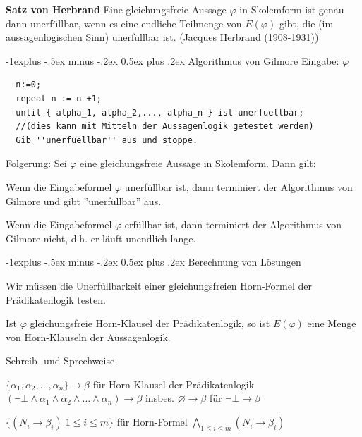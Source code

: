 \documentclass[a4paper]{article}
\makeatletter
\renewcommand{\note}[2]{\begin{noteBox} \textbf{#1} #2 \end{noteBox}}
\renewcommand{\subsection}{\@startsection{subsection}{2}{0mm}%
                {-1explus -.5ex minus -.2ex}%
                {0.5ex plus .2ex}%
                {\normalfont\normalsize\bfseries}}
\makeatother
\begin{document}
\begin{multicols}{3}
  \note{Satz von Herbrand}{Eine gleichungsfreie Aussage $\varphi$ in Skolemform ist genau dann unerfüllbar, wenn es eine endliche Teilmenge von $E(\varphi)$ gibt, die (im aussagenlogischen Sinn) unerfüllbar ist. (Jacques Herbrand (1908-1931))}

  \subsection{Algorithmus von Gilmore}
  Eingabe: $\varphi$
  \begin{lstlisting}
  n:=0;
  repeat n := n +1;
  until { alpha_1, alpha_2,..., alpha_n } ist unerfuellbar; 
  //(dies kann mit Mitteln der Aussagenlogik getestet werden)
  Gib ''unerfuellbar'' aus und stoppe.
  \end{lstlisting}

  Folgerung: Sei $\varphi$  eine gleichungsfreie Aussage in Skolemform. Dann gilt:
  \begin{itemize*}
    \item Wenn die Eingabeformel $\varphi$ unerfüllbar ist, dann terminiert der Algorithmus von Gilmore und gibt ''unerfüllbar'' aus.
    \item Wenn die Eingabeformel $\varphi$ erfüllbar ist, dann terminiert der Algorithmus von Gilmore nicht, d.h. er läuft unendlich lange.
  \end{itemize*}

  \subsection{Berechnung von Lösungen}
  \begin{itemize*}
    \item Wir müssen die Unerfüllbarkeit einer gleichungsfreien Horn-Formel der Prädikatenlogik testen.
    \item Ist $\varphi$ gleichungsfreie Horn-Klausel der Prädikatenlogik, so ist $E(\varphi)$ eine Menge von Horn-Klauseln der Aussagenlogik.
  \end{itemize*}

  Schreib- und Sprechweise
  \begin{itemize*}
    \item $\{\alpha_1,\alpha_2,...,\alpha_n\}\rightarrow\beta$ für Horn-Klausel der Prädikatenlogik $(\lnot\bot\wedge\alpha_1 \wedge\alpha_2\wedge...\wedge\alpha_n)\rightarrow\beta$ insbes. $\varnothing\rightarrow\beta$ für $\lnot\bot\rightarrow\beta$
    \item $\{(N_i\rightarrow\beta_i) | 1\leq i\leq m\}$ für Horn-Formel $\bigwedge_{1\leq i\leq m} (N_i\rightarrow\beta_i)$
  \end{itemize*}


\end{multicols}
\end{document}
